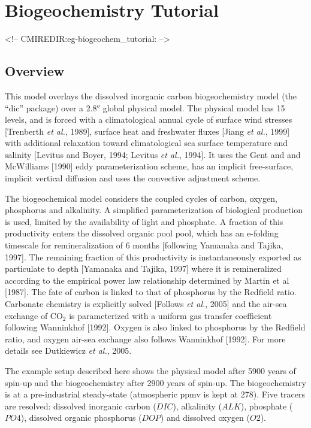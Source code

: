 \section{Biogeochemistry Tutorial}
\label{www:tutorials}
\label{sect:eg-biogeochem_tutorial}
\begin{rawhtml}
<!-- CMIREDIR:eg-biogeochem_tutorial: -->
\end{rawhtml}

\subsection{Overview}
This model overlays the dissolved inorganic carbon biogeochemistry
model (the ``dic'' package) over a 2.8$^o$ global physical model. The
physical model has 15 levels, and is forced with a climatological
annual cycle of surface wind stresses [Trenberth \textit{et al.},
1989], surface heat and freshwater fluxes [Jiang \textit{et al.},
1999] with additional relaxation toward climatological sea surface
temperature and salinity [Levitus and Boyer, 1994; Levitus \textit{et
  al.}, 1994].  It uses the Gent and and McWilliams [1990] eddy
parameterization scheme, has an implicit free-surface, implicit
vertical diffusion and uses the convective adjustment scheme.

The biogeochemical model considers the coupled cycles of carbon,
oxygen, phosphorus and alkalinity.  A simplified parameterization of
biological production is used, limited by the availability of light
and phosphate.  A fraction of this productivity enters the dissolved
organic pool pool, which has an e-folding timescale for
remineralization of 6 months [following Yamanaka and Tajika, 1997].
The remaining fraction of this productivity is instantaneously
exported as particulate to depth [Yamanaka and Tajika, 1997] where it
is remineralized according to the empirical power law relationship
determined by Martin et al [1987].  The fate of carbon is linked to
that of phosphorus by the Redfield ratio. Carbonate chemistry is
explicitly solved [Follows {\it et al.}, 2005] and the air-sea
exchange of CO$_2$ is parameterized with a uniform gas transfer
coefficient following Wanninkhof [1992]. Oxygen is also linked to
phosphorus by the Redfield ratio, and oxygen air-sea exchange also
follows Wanninkhof [1992].  For more details see Dutkiewicz {\it et
  al.}, 2005.

The example setup described here shows the physical model after 5900
years of spin-up and the biogeochemistry after 2900 years of spin-up.
The biogeochemistry is at a pre-industrial steady-state (atmospheric
ppmv is kept at 278). Five tracers are resolved: dissolved inorganic
carbon ($DIC$), alkalinity ($ALK$), phosphate ($PO4$), dissolved
organic phosphorus ($DOP$) and dissolved oxygen ($O2$).

